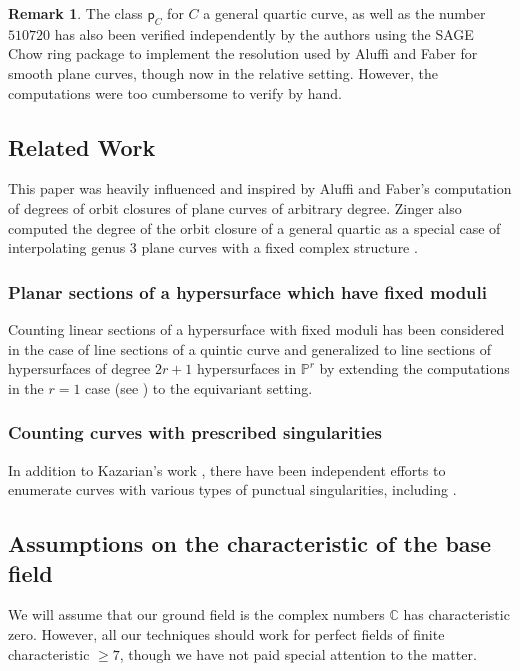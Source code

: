 \documentclass[12 pt, reqno]{amsart}
\theoremstyle{definition}
\newtheorem{rmk}[thm]{Remark}
\newcommand{\mb}{\mathbb}
\renewcommand{\k}{\mathbb{C}}
\newcommand{\p}{\mathsf{p}}
\begin{document}
\begin{rmk}
  The class $\p_{C}$ for $C$ a general quartic curve, as well as the
  number $510720$ has also been verified independently by the authors
  using the SAGE Chow ring package \cite{ChowRing} to implement the
  resolution used by Aluffi and Faber \cite{AF93} for smooth plane
  curves, though now in the relative setting. However, the
  computations were too cumbersome to verify by hand.
\end{rmk}




\subsection{Related Work}

This paper was heavily influenced and inspired by Aluffi and Faber's
computation of degrees of orbit closures of plane curves of arbitrary
degree.  Zinger also computed the degree of the orbit closure of a
general quartic as a special case of interpolating genus 3 plane
curves with a fixed complex structure \cite{Z05}.


\subsubsection{Planar sections of a hypersurface which have fixed
  moduli}
Counting linear sections of a hypersurface with fixed moduli has been
considered in the case of line sections of a quintic curve \cite{CL08}
and generalized to line sections of hypersurfaces of degree $2r+1$
hypersurfaces in $\mb{P}^r$ \cite{FML} by extending the computations
in the $r=1$ case (see \cite{AFpoint}) to the equivariant setting.

\subsubsection{Counting curves with prescribed singularities}
In addition to Kazarian's work \cite{Kazarian}, there have been
independent efforts to enumerate curves with various types of punctual
singularities, including \cite{BM16,K06,H03}.  

\subsection{Assumptions on the characteristic of the base field}
\label{basefield}

We will assume that our ground field is the complex numbers $\k$ has
characteristic zero.  However, all our techniques should work for
perfect fields of finite characteristic $\geq 7$, though we have not
paid special attention to the matter.
\end{document}
